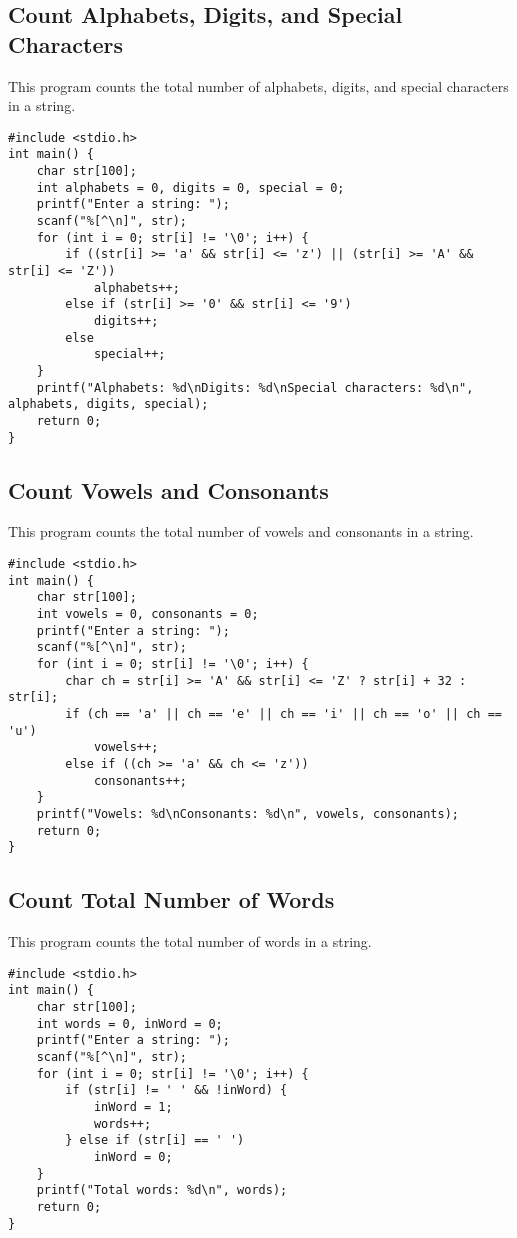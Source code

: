 \documentclass[a4paper,12pt]{article}
\begin{document}
\subsection{Count Alphabets, Digits, and Special Characters}
This program counts the total number of alphabets, digits, and special characters in a string.
\begin{lstlisting}[caption={Count Alphabets, Digits, and Special Characters}]
#include <stdio.h>
int main() {
    char str[100];
    int alphabets = 0, digits = 0, special = 0;
    printf("Enter a string: ");
    scanf("%[^\n]", str);
    for (int i = 0; str[i] != '\0'; i++) {
        if ((str[i] >= 'a' && str[i] <= 'z') || (str[i] >= 'A' && str[i] <= 'Z'))
            alphabets++;
        else if (str[i] >= '0' && str[i] <= '9')
            digits++;
        else
            special++;
    }
    printf("Alphabets: %d\nDigits: %d\nSpecial characters: %d\n", alphabets, digits, special);
    return 0;
}
\end{lstlisting}
\clearpage

\subsection{Count Vowels and Consonants}
This program counts the total number of vowels and consonants in a string.
\begin{lstlisting}[caption={Count Vowels and Consonants}]
#include <stdio.h>
int main() {
    char str[100];
    int vowels = 0, consonants = 0;
    printf("Enter a string: ");
    scanf("%[^\n]", str);
    for (int i = 0; str[i] != '\0'; i++) {
        char ch = str[i] >= 'A' && str[i] <= 'Z' ? str[i] + 32 : str[i];
        if (ch == 'a' || ch == 'e' || ch == 'i' || ch == 'o' || ch == 'u')
            vowels++;
        else if ((ch >= 'a' && ch <= 'z'))
            consonants++;
    }
    printf("Vowels: %d\nConsonants: %d\n", vowels, consonants);
    return 0;
}
\end{lstlisting}
\clearpage

\subsection{Count Total Number of Words}
This program counts the total number of words in a string.
\begin{lstlisting}[caption={Count Total Number of Words}]
#include <stdio.h>
int main() {
    char str[100];
    int words = 0, inWord = 0;
    printf("Enter a string: ");
    scanf("%[^\n]", str);
    for (int i = 0; str[i] != '\0'; i++) {
        if (str[i] != ' ' && !inWord) {
            inWord = 1;
            words++;
        } else if (str[i] == ' ')
            inWord = 0;
    }
    printf("Total words: %d\n", words);
    return 0;
}
\end{lstlisting}
\clearpage
\end{document}

